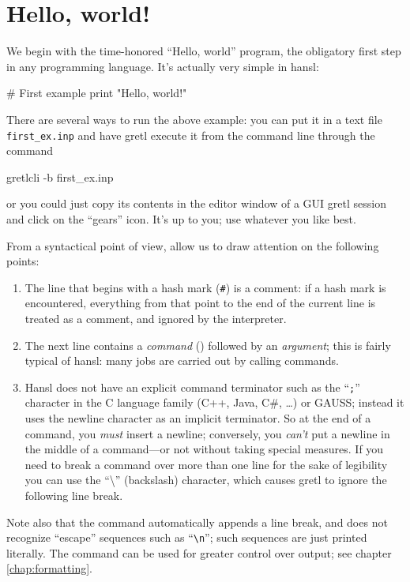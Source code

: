 \chapter{Hello, world!}
\label{chap:hello}

We begin with the time-honored ``Hello, world'' program, the
obligatory first step in any programming language. It's actually very
simple in hansl:
\begin{code}
  # First example
  print "Hello, world!"
\end{code}

There are several ways to run the above example: you can put it in a
text file \texttt{first\_ex.inp} and have gretl execute it from the
command line through the command
\begin{code}
  gretlcli -b first_ex.inp
\end{code}
or you could just copy its contents in the editor window of a GUI
gretl session and click on the ``gears'' icon. It's up to you; use
whatever you like best.

From a syntactical point of view, allow us to draw attention on
the following points:
\begin{enumerate}
\item The line that begins with a hash mark (\texttt{\#}) is a
  comment: if a hash mark is encountered, everything from that point
  to the end of the current line is treated as a comment, and ignored
  by the interpreter.
\item The next line contains a \emph{command} () followed
  by an \emph{argument}; this is fairly typical of hansl: many jobs
  are carried out by calling commands.
\item Hansl does not have an explicit command terminator such as the
  ``\texttt{;}'' character in the C language family (C++, Java, C\#,
  \ldots) or GAUSS; instead it uses the newline character as an
  implicit terminator. So at the end of a command, you \emph{must}
  insert a newline; conversely, you \emph{can't} put a newline in the
  middle of a command---or not without taking special measures. If you
  need to break a command over more than one line for the sake of
  legibility you can use the ``\textbackslash'' (backslash) character,
  which causes gretl to ignore the following line break.
\end{enumerate}

Note also that the  command automatically appends a line
break, and does not recognize ``escape'' sequences such as
``\verb|\n|''; such sequences are just printed literally. The
 command can be used for greater control over output; see
chapter \ref{chap:formatting}.

